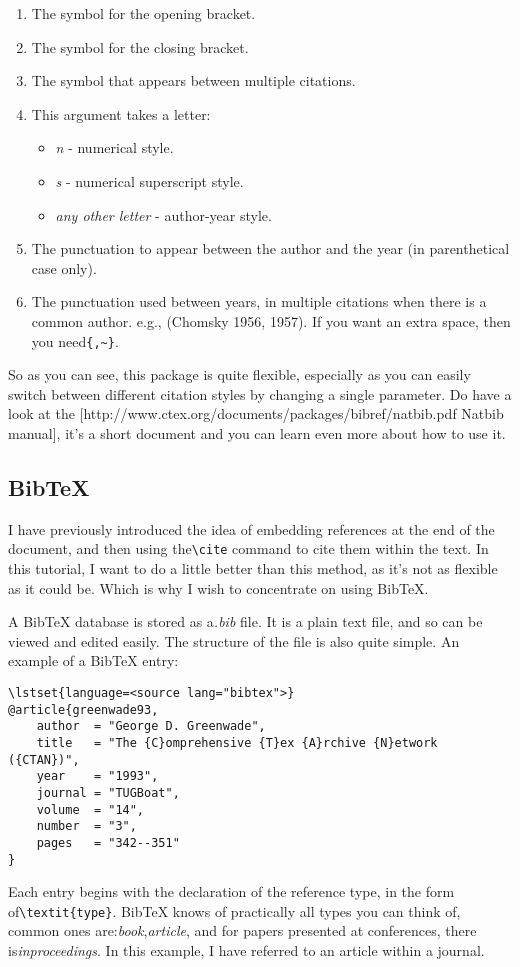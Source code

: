 \begin{enumerate}
\item The symbol for the opening bracket.
\item The symbol for the closing bracket.
\item The symbol that appears between multiple citations.
\item This argument takes a letter: \begin{itemize}
\item \textit{n} - numerical style.
\item \textit{s} - numerical superscript style.
\item \textit{any other letter} - author-year style.
\end{itemize}
\item The punctuation to appear between the author and the year (in parenthetical case only).
\item The punctuation used between years, in multiple citations when there is a common author. e.g., (Chomsky 1956, 1957). If you want an extra space, then you need\verb|{,~}|.
\end{enumerate}

So as you can see, this package is quite flexible, especially as you can easily
switch between different citation styles by changing a single parameter. Do
have a look at the [http://www.ctex.org/documents/packages/bibref/natbib.pdf
Natbib manual], it's a short document and you can learn even more about how to
use it.

\subsection{BibTeX}
I have previously introduced the idea of embedding references at the end of the
document, and then using the\verb|\cite| command to cite them within the text.
In this tutorial, I want to do a little better than this method, as it's not as
flexible as it could be. Which is why I wish to concentrate on
using BibTeX.

A BibTeX database is stored as a\textit{.bib} file. It is a plain text file,
and so can be viewed and edited easily. The structure of the file is also quite
simple. An example of a BibTeX entry:

\begin{lstlisting}
\lstset{language=<source lang="bibtex">}
@article{greenwade93,
    author  = "George D. Greenwade",
    title   = "The {C}omprehensive {T}ex {A}rchive {N}etwork ({CTAN})",
    year    = "1993",
    journal = "TUGBoat",
    volume  = "14",
    number  = "3",
    pages   = "342--351"
}
\end{lstlisting}
Each entry begins with the declaration of the reference type, in the form
of\verb|\textit{type}|. BibTeX knows of practically all types you can think of,
common ones are:\textit{book},\textit{article}, and for papers presented at
conferences, there is\textit{inproceedings}. In this example, I have referred
to an article within a journal.

